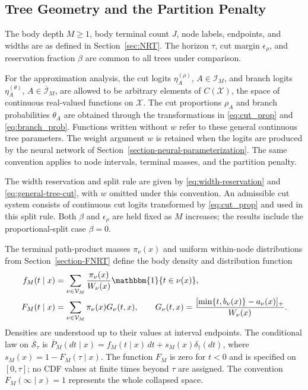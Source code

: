 \documentclass[11pt]{article}
\numberwithin{equation}{section}
\begin{document}
\subsection{Tree Geometry and the Partition Penalty}

The body depth $M\geq1$, body terminal count $J$, node labels, endpoints, and widths are as defined in Section~\ref{sec:NRT}. The horizon $\tau$, cut margin $\epsilon_\rho$, and reservation fraction $\beta$ are common to all trees under comparison.

For the approximation analysis, the cut logits $\eta_A^{(\rho)}$, $A\in\mathcal I_M$, and branch logits $\eta_A^{(\theta)}$, $A\in\overline{\mathcal I}_M$, are allowed to be arbitrary elements of $C(\mathcal X)$, the space of continuous real-valued functions on $\mathcal X$. The cut proportions $\rho_A$ and branch probabilities $\theta_A$ are obtained through the transformations in \eqref{eq:cut_prop} and \eqref{eq:branch_prob}. Functions written without $w$ refer to these general continuous tree parameters. The weight argument $w$ is retained when the logits are produced by the neural network of Section~\ref{section-neural-parameterization}. The same convention applies to node intervals, terminal masses, and the partition penalty.

The width reservation and split rule are given by \eqref{eq:width-reservation} and \eqref{eq:general-tree-cut}, with $w$ omitted under this convention. An admissible cut system consists of continuous cut logits transformed by \eqref{eq:cut_prop} and used in this split rule. Both $\beta$ and $\epsilon_\rho$ are held fixed as $M$ increases; the results include the proportional-split case $\beta=0$.

The terminal path-product masses $\pi_\nu(x)$ and uniform within-node distributions from Section~\ref{section-FNRT} define the body density and distribution function
\begin{align}
    f_M(t\mid x)
    &=\sum_{\nu\in\mathcal V_M}
      \frac{\pi_\nu(x)}{W_\nu(x)}
      \mathbbm{1}\{t\in\nu(x)\}, \label{eq:finite-tree-density}\\
    F_M(t\mid x)
    &=\sum_{\nu\in\mathcal V_M}\pi_\nu(x)G_\nu(t,x),
      \qquad
      G_\nu(t,x)=
      \frac{[\min\{t,b_\nu(x)\}-a_\nu(x)]_+}{W_\nu(x)}.
      \label{eq:finite-tree-cdf}
\end{align}
Densities are understood up to their values at interval endpoints. The conditional law on $\overline{\mathcal S}_\tau$ is $\bar P_M(dt\mid x)=f_M(t\mid x)\,dt+s_M(x)\delta_\dagger(dt)$, where $s_M(x)=1-F_M(\tau\mid x)$. The function $F_M$ is zero for $t<0$ and is specified on $[0,\tau]$; no CDF values at finite times beyond $\tau$ are assigned. The convention $F_M(\infty\mid x)=1$ represents the whole collapsed space.
\end{document}

